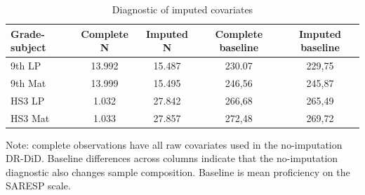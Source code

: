 ﻿\begin{table}[htbp]
\centering
\caption{Diagnostic of imputed covariates}
\label{tab:diagnostico_imputacao}
\begin{tabular}{lcccc}
\toprule
Grade-subject & Complete N & Imputed N & Complete baseline & Imputed baseline \\
\midrule
9th LP & 13.992 & 15.487 & 230.07 & 229,75 \\
9th Mat & 13.999 & 15.495 & 246,56 & 245,87 \\
HS3 LP & 1.032 & 27.842 & 266,68 & 265,49 \\
HS3 Mat & 1.033 & 27.857 & 272,48 & 269,72 \\
\bottomrule
\end{tabular}
\vspace{0.2cm}
\begin{flushleft}
\footnotesize Note: complete observations have all raw covariates used in the no-imputation DR-DiD. Baseline differences across columns indicate that the no-imputation diagnostic also changes sample composition. Baseline is mean proficiency on the SARESP scale.
\end{flushleft}
\end{table}



